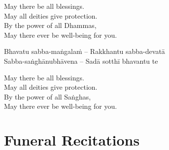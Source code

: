 \begin{english-verses}
  May there be all blessings.\\
  May all deities give protection.\\
  By the power of all Dhammas,\\
  May there ever be well-being for you.
\end{english-verses}

Bhavatu sabba-maṅgalaṁ – Rakkhantu sabba-devatā\\
Sabba-saṅghānubhāvena – Sadā sotthī bhavantu te

\begin{english-verses}
  May there be all blessings.\\
  May all deities give protection.\\
  By the power of all Saṅghas,\\
  May there ever be well-being for you.
\end{english-verses}

\suttaRef{[Trad]}



\chapter{Funeral Recitations}

\clearpage
